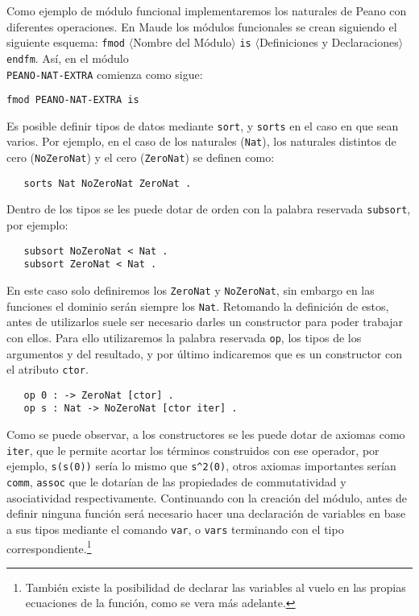 Como ejemplo de módulo funcional implementaremos los naturales de Peano con diferentes operaciones. En Maude los módulos funcionales se crean siguiendo el siguiente esquema: \texttt{fmod} $\langle$Nombre del Módulo$\rangle$ \texttt{is} $\langle$Definiciones y Declaraciones$\rangle$ \texttt{endfm}. Así, en el módulo\\ \texttt{PEANO-NAT-EXTRA} comienza como sigue: \par

{\codesize
\begin{verbatim}
fmod PEANO-NAT-EXTRA is
\end{verbatim}
}

Es posible definir tipos de datos mediante \texttt{sort}, y \texttt{sorts} en el caso en que sean varios. Por ejemplo, en el caso de los naturales (\texttt{Nat}), los naturales distintos de cero (\texttt{NoZeroNat}) y el cero (\texttt{ZeroNat}) se definen como:\par

{\codesize
\begin{verbatim}
   sorts Nat NoZeroNat ZeroNat .
\end{verbatim}
}

Dentro de los tipos se les puede dotar de orden con la palabra reservada \texttt{subsort}, por ejemplo: \par

{\codesize
\begin{verbatim}
   subsort NoZeroNat < Nat .
   subsort ZeroNat < Nat .
\end{verbatim}
}

En este caso solo definiremos los \texttt{ZeroNat} y \texttt{NoZeroNat}, sin embargo en las funciones el dominio serán siempre los \texttt{Nat}. Retomando la definición de estos, antes de utilizarlos suele ser necesario darles un constructor para poder trabajar con ellos. Para ello utilizaremos la palabra reservada \texttt{op}, los tipos de los argumentos y del resultado, y por último indicaremos que es un constructor con el atributo \texttt{ctor}. \par

{\codesize
\begin{verbatim}
   op 0 : -> ZeroNat [ctor] .
   op s : Nat -> NoZeroNat [ctor iter] .
\end{verbatim}
}

Como se puede observar, a los constructores se les puede dotar de axiomas como \texttt{iter}, que le permite acortar los términos construidos con ese operador, por ejemplo, \verb"s(s(0))" sería lo mismo que \verb"s^2(0)", otros axiomas importantes serían \texttt{comm}, \texttt{assoc} que le dotarían de las propiedades de commutatividad y asociatividad respectivamente. Continuando con la creación del módulo, antes de definir ninguna función será necesario hacer una declaración de variables en base a sus tipos mediante el comando \texttt{var}, o \texttt{vars} terminando con el tipo correspondiente.\footnote{También existe la posibilidad de declarar las variables al vuelo en las propias ecuaciones de la función, como se vera más adelante.} \par

